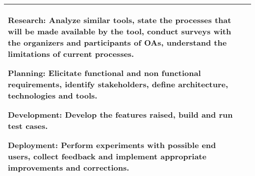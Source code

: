 \begin{table}[!htb]
\begin{tabular}{l|p{11cm}}
    \begin{inparaenum}[(i)]
      \item Research: Analyze similar tools, state the processes that will be made available by the tool, conduct surveys with the organizers and participants of \acp{OA}, understand the limitations of current processes.
      \item Planning: Elicitate functional and non functional requirements, identify stakeholders, define architecture, technologies and tools.
      \item Development: Develop the features raised, build and run test cases.
      \item Deployment: Perform experiments with possible end users, collect feedback and implement appropriate improvements and corrections.
    \end{inparaenum}  
    \\
    \toprule
  \end{tabular}
\end{table}